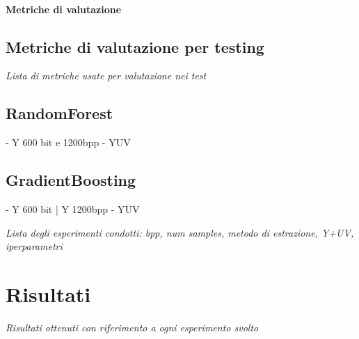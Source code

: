\paragraph{Metriche di valutazione}
\subsection{Metriche di valutazione per testing}
\textit{Lista di metriche usate per valutazione nei test}

\subsection{RandomForest}
- Y 600 bit e 1200bpp
- YUV
\subsection{GradientBoosting}
- Y 600 bit | Y 1200bpp
- YUV

\textit{Lista degli esperimenti condotti: bpp, num samples, metodo di estrazione, Y+UV, iperparametri}


\section{Risultati}
\textit{Risultati ottenuti con riferimento a ogni esperimento svolto}
